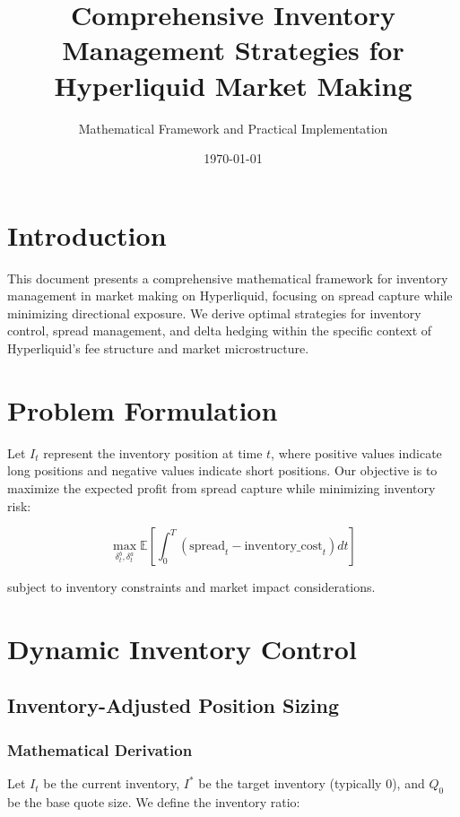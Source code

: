 \documentclass[11pt,a4paper]{article}
\title{\textbf{Comprehensive Inventory Management Strategies for Hyperliquid Market Making}}
\author{Mathematical Framework and Practical Implementation}
\date{\today}
\theoremstyle{definition}
\begin{document}
\maketitle
\tableofcontents
\newpage

\section{Introduction}

This document presents a comprehensive mathematical framework for inventory management in market making on Hyperliquid, focusing on spread capture while minimizing directional exposure. We derive optimal strategies for inventory control, spread management, and delta hedging within the specific context of Hyperliquid's fee structure and market microstructure.

\section{Problem Formulation}

Let $I_t$ represent the inventory position at time $t$, where positive values indicate long positions and negative values indicate short positions. Our objective is to maximize the expected profit from spread capture while minimizing inventory risk:

\begin{equation}
\max_{\delta_t^b, \delta_t^a} \mathbb{E}\left[\int_0^T (\text{spread}_t - \text{inventory\_cost}_t) dt\right]
\end{equation}

subject to inventory constraints and market impact considerations.

\section{Dynamic Inventory Control}

\subsection{Inventory-Adjusted Position Sizing}

\subsubsection{Mathematical Derivation}

Let $I_t$ be the current inventory, $I^*$ be the target inventory (typically 0), and $Q_0$ be the base quote size. We define the inventory ratio:
\end{document}
